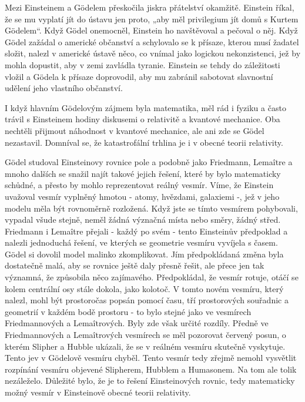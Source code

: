   Mezi Einsteinem a Gödelem přeskočila jiskra přátelství okamžitě. Einstein říkal, že se mu vyplatí
  jít do ústavu jen proto, „aby měl privilegium jít domů s Kurtem Gödelem“. Když Gödel onemocněl,
  Einstein ho navštěvoval a pečoval o něj. Když Gödel zažádal o americké občanství a schylovalo se k
  přísaze, kterou musí žadatel složit, nalezl v americké ústavě něco, co vnímal jako logickou
  nekonzistenci, jež by mohla dopustit, aby v zemi zavládla tyranie. Einstein se tehdy do
  záležitosti vložil a Gödela k přísaze doprovodil, aby mu zabránil sabotovat slavnostní udělení
  jeho vlastního občanství. 
  
  I když hlavním Gödelovým zájmem byla matematika, měl rád i fyziku a často trávil s Einsteinem
  hodiny diskusemi o relativitě a kvantové mechanice. Oba nechtěli přijmout náhodnost v kvantové
  mechanice, ale ani zde se Gödel nezastavil. Domníval se, že katastrofální trhlina je i v obecné
  teorii relativity. 
  
  Gödel studoval Einsteinovy rovnice pole a podobně jako Friedmann, Lemaître a mnoho dalších se
  snažil najít takové jejich řešení, které by bylo matematicky schůdné, a přesto by mohlo
  reprezentovat reálný vesmír. Víme, že Einstein uvažoval vesmír vyplněný hmotou - atomy, hvězdami,
  galaxiemi -, jež v jeho modelu měla být rovnoměrně rozložená. Když jste se tímto vesmírem
  pohybovali, vypadal všude stejně, neměl žádná význačná místa nebo směry, žádný střed. Friedmann i
  Lemaître přejali - každý po svém - tento Einsteinův předpoklad a nalezli jednoduchá řešení, ve
  kterých se geometrie vesmíru vyvíjela s časem. Gödel si dovolil model malinko zkomplikovat. Jím
  předpokládaná změna byla dostatečně malá, aby se rovnice ještě daly přesně řešit, ale přece jen
  tak významná, že způsobila něco zajímavého. Předpokládal, že vesmír rotuje, otáčí se kolem
  centrální osy stále dokola, jako kolotoč. V tomto novém vesmíru, který nalezl, mohl být
  prostoročas popsán pomocí času, tří prostorových souřadnic a geometrií v každém bodě prostoru - to
  bylo stejné jako ve vesmírech Friedmannových a Lemaîtrových. Byly zde však určité rozdíly. Předně
  ve Friedmannových a Lemaîtrových vesmírech se měl pozorovat červený posun, o kterém Slipher a
  Hubble ukázali, že se v reálném vesmíru skutečně vyskytuje. Tento jev v Gödelově vesmíru chyběl.
  Tento vesmír tedy zřejmě nemohl vysvětlit rozpínání vesmíru objevené Slipherem, Hubblem a
  Humasonem. Na tom ale tolik nezáleželo. Důležité bylo, že je to řešení Einsteinových rovnic, tedy
  matematicky možný vesmír v Einsteinově obecné teorii relativity. 
  
